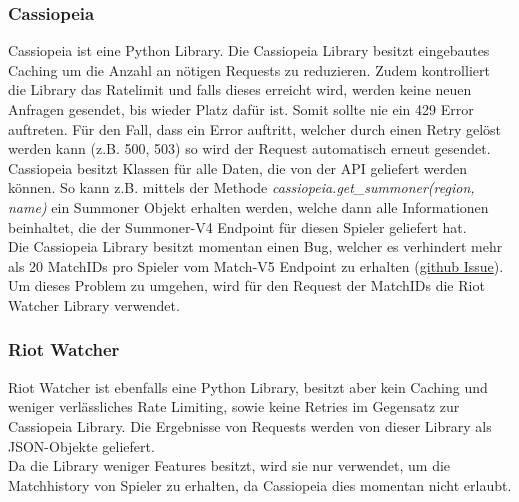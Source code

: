 \subsubsection{Cassiopeia}
Cassiopeia ist eine Python Library. Die Cassiopeia Library besitzt eingebautes Caching um die Anzahl an nötigen Requests zu reduzieren. Zudem kontrolliert die Library das Ratelimit und falls dieses erreicht wird, werden keine neuen Anfragen gesendet, bis wieder Platz dafür ist. Somit sollte nie ein 429 Error auftreten. Für den Fall, dass ein Error auftritt, welcher durch einen Retry gelöst werden kann (z.B. 500, 503) so wird der Request automatisch erneut gesendet.\\
Cassiopeia besitzt Klassen für alle Daten, die von der API geliefert werden können. So kann z.B. mittels der Methode \textit{cassiopeia.get\_summoner(region, name)} ein Summoner Objekt erhalten werden, welche dann alle Informationen beinhaltet, die der Summoner-V4 Endpoint für diesen Spieler geliefert hat.\\

Die Cassiopeia Library besitzt momentan einen Bug, welcher es verhindert mehr als 20 MatchIDs pro Spieler vom Match-V5 Endpoint zu erhalten (\href{https://github.com/meraki-analytics/cassiopeia/issues/403}{github Issue}).\\
Um dieses Problem zu umgehen, wird für den Request der MatchIDs die Riot Watcher Library verwendet.

\subsubsection{Riot Watcher}
Riot Watcher ist ebenfalls eine Python Library, besitzt aber kein Caching und weniger verlässliches Rate Limiting, sowie keine Retries im Gegensatz zur Cassiopeia Library.
Die Ergebnisse von Requests werden von dieser Library als JSON-Objekte geliefert.\\
Da die Library weniger Features besitzt, wird sie nur verwendet, um die Matchhistory von Spieler zu erhalten, da Cassiopeia dies momentan nicht erlaubt.